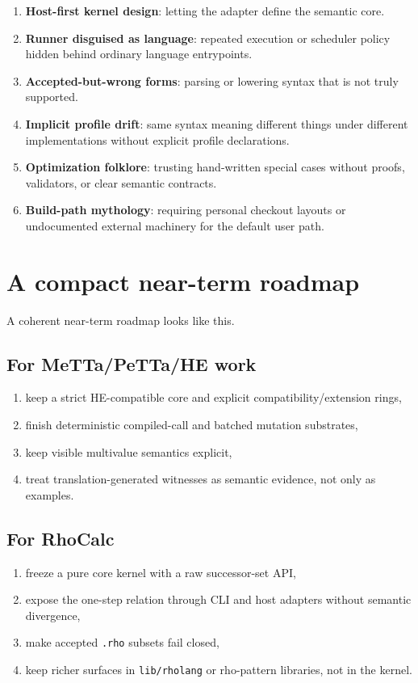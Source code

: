 \documentclass[11pt]{article}
\begin{document}
\begin{enumerate}
  \item \textbf{Host-first kernel design}: letting the adapter define the semantic core.
  \item \textbf{Runner disguised as language}: repeated execution or scheduler policy hidden behind ordinary language entrypoints.
  \item \textbf{Accepted-but-wrong forms}: parsing or lowering syntax that is not truly supported.
  \item \textbf{Implicit profile drift}: same syntax meaning different things under different implementations without explicit profile declarations.
  \item \textbf{Optimization folklore}: trusting hand-written special cases without proofs, validators, or clear semantic contracts.
  \item \textbf{Build-path mythology}: requiring personal checkout layouts or undocumented external machinery for the default user path.
\end{enumerate}

\section{A compact near-term roadmap}
A coherent near-term roadmap looks like this.

\subsection{For MeTTa/PeTTa/HE work}
\begin{enumerate}
  \item keep a strict HE-compatible core and explicit compatibility/extension rings,
  \item finish deterministic compiled-call and batched mutation substrates,
  \item keep visible multivalue semantics explicit,
  \item treat translation-generated witnesses as semantic evidence, not only as examples.
\end{enumerate}

\subsection{For RhoCalc}
\begin{enumerate}
  \item freeze a pure core kernel with a raw successor-set API,
  \item expose the one-step relation through CLI and host adapters without semantic divergence,
  \item make accepted \texttt{.rho} subsets fail closed,
  \item keep richer surfaces in \texttt{lib/rholang} or rho-pattern libraries, not in the kernel.
\end{enumerate}
\end{document}
